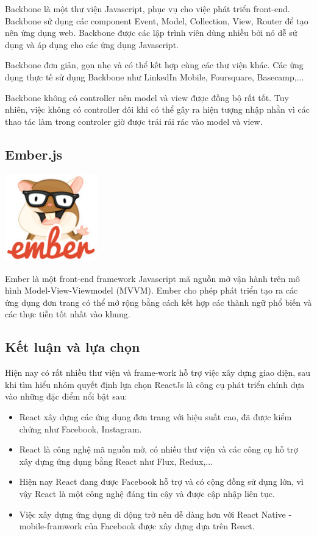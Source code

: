 Backbone là một thư viện Javascript, phục vụ cho việc phát triển front-end. Backbone sử dụng các component Event, Model, Collection, View, Router để tạo nên ứng dụng web. Backbone được các lập trình viên dùng nhiều bởi nó dễ sử dụng và áp dụng cho các ứng dụng Javascript.

Backbone đơn giản, gọn nhẹ và có thể kết hợp cùng các thư viện khác. Các ứng dụng thực tế sử dụng Backbone như LinkedIn Mobile, Foursquare, Basecamp,...

Backbone không có controller nên model và view được đồng bộ rất tốt. Tuy nhiên, việc không có controller đôi khi có thể gây ra hiện tượng nhập nhằn vì các thao tác làm trong controler giờ được trải rải rác vào model và view.
\subsection{Ember.js}
\begin{center}
  \captionsetup{type=figure}
  \includegraphics[width=4cm]{img/ember-logo.png}
\end{center}

Ember là một front-end framework Javascript mã nguồn mở vận hành trên mô hình Model-View-Viewmodel (MVVM). Ember cho phép phát triển tạo ra các ứng dụng đơn trang có thể mở rộng bằng cách kết hợp các thành ngữ phổ biến và các thực tiễn tốt nhất vào khung.
\subsection{Kết luận và lựa chọn}
Hiện nay có rất nhiều thư viện và frame-work hỗ trợ việc xây dựng giao diện, sau khi tìm hiểu nhóm quyết định lựa chọn ReactJs là công cụ phát triển chính dựa vào những đặc điểm nổi bật sau:
\begin{itemize}
    \item React xây dựng các ứng dụng đơn trang với hiệu suất cao, đã được kiểm chứng như Facebook, Instagram.
    \item React là công nghệ mã nguồn mở, có nhiều thư viện và các công cụ hỗ trợ xây dựng ứng dụng bằng React như Flux, Redux,...
    \item Hiện nay React đang được Facebook hỗ trợ và có cộng đồng sử dụng lớn, vì vậy React là một công nghệ đáng tin cậy và được cập nhập liên tục.
    \item Việc xây dựng ứng dụng di động trở nên dễ dàng hơn với React Native - mobile-framwork của Facebook được xây dựng dựa trên React.
\end {itemize}    
